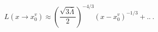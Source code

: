\begin{equation}
L(x\rightarrow x^v_0)\approx(\frac{\sqrt{3\bar\Lambda}}{2})^{-4/3} (x-x^v_0)^{-1/3}+..  \ .
\end{equation}

